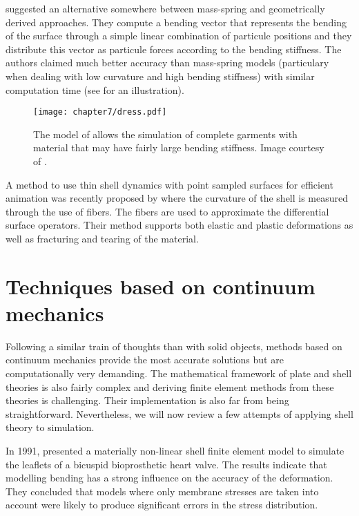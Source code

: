\cite{Volino06} suggested an alternative somewhere between mass-spring and geometrically derived approaches. They compute a bending vector that represents the bending of the surface through  a simple linear combination of particule positions and they distribute this vector as particule forces according to the bending stiffness. The authors claimed much better accuracy than mass-spring models (particulary when dealing with low curvature and high bending stiffness) with similar computation time (see  for an illustration). 
%
\begin{figure}[ht]
\begin{center}
\texttt{[image: chapter7/dress.pdf]}
\caption[Simulation of complete garments that have large bending stiffness]{The model of \citeauthor{Volino06} allows the simulation of complete garments with material that may have fairly large bending stiffness. Image courtesy of \cite{Volino06}.}
\label{chap7:fig-dress}
\end{center}
\end{figure}

A method to use thin shell dynamics with point sampled surfaces for efficient animation was recently proposed by \cite{Wicke05} where the curvature of the shell is measured through the use of fibers. The fibers are used to approximate the differential surface operators. Their method supports both elastic and plastic deformations as well as fracturing and tearing of the material. 
		

\section{Techniques based on continuum mechanics}

Following a similar train of thoughts than with solid objects, methods based on continuum mechanics provide the most accurate solutions but are computationally very demanding. The mathematical framework of plate and shell theories is also fairly complex and deriving finite element methods from these theories is challenging. Their implementation is also far from being straightforward. Nevertheless, we will now review a few attempts of applying shell theory to simulation. 

In 1991, \citeauthor{Black91} presented a materially non-linear shell finite element model to simulate the leaflets of a bicuspid bioprosthetic heart valve. The results indicate that modelling bending has a strong influence on the accuracy of the deformation. They concluded that models where only membrane stresses are taken into account were likely to produce significant errors in the stress distribution. 

